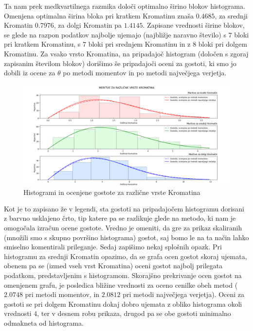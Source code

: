 \documentclass{article}
\begin{document}
Ta nam prek medkvartilnega razmika določi optimalno širino blokov histograma. Omenjena optimalna širina bloka pri kratkem Kromatinu znaša $0.4685$, za srednji Kromatin $0.7976$, za dolgi Kromatin pa $1.4145$.
Zapisane vrednosti širine blokov, se glede na razpon podatkov najbolje ujemajo (najbližje naravno število) s $7$ bloki pri kratkem Kromatinu, s $7$ bloki pri srednjem Kromatinu in z $8$ bloki pri dolgem Kromatinu. 
Za vsako vrsto Kromatina, na pripadajoč histogram (določen s zgoraj zapisanim številom blokov) dorišimo še pripadajoči oceni za gostoti, ki smo jo dobili iz ocene za $\theta$ po metodi momentov in po metodi največjega verjetja. 
\begin{figure}[H]
    \begin{center}
    \includegraphics[width=\linewidth]{naloga2f.png}
    \vspace*{-5mm}\caption{Histogrami in ocenjene gostote za različne vrste Kromatina}
    \end{center}    
\end{figure}
Kot je to zapisano že v legendi, sta gostoti na pripadajočem histogramu dorisani z barvno usklajeno črto, tip katere pa se razlikuje glede na metodo, ki nam je omogočala izračun ocene gostote.
Vredno je omeniti, da gre za prikaz skaliranih (množili smo s skupno površino histograma) gostot, saj bomo le na ta način lahko smiselno komentirali prileganje. 
\newline
Sedaj zapišimo nekaj splošnih opazk.
Pri histogramu za srednji Kromatin opazimo, da se grafa ocen gostot skoraj ujemata, obenem pa se (izmed vseh vrst Kromatina) oceni gostot najbolj prilegata podatkom, predstavljenim s histogramom. 
Skorajšno prekrivanje ocen gostot na omenjenem grafu, je posledica bližine vrednosti za oceno cenilke obeh metod ($2.0748$ pri metodi momentov,  in $2.0812$ pri metodi največjega verjetja).
Oceni za gostoti se pri dolgem Kromatinu dokaj dobro ujemata z obliko histograma okoli vrednosti $4$, ter v desnem robu prikaza, drugod pa se obe gostoti minimalno odmakneta od histograma. 
\end{document}

